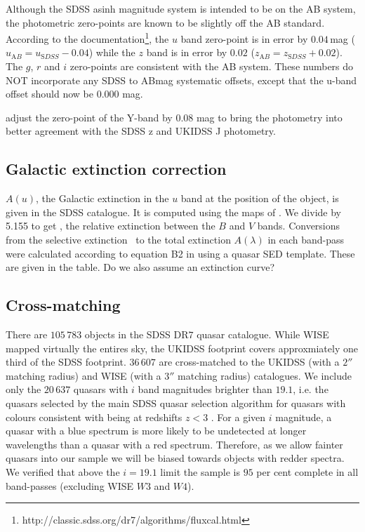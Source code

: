 Although the SDSS asinh magnitude system is intended to be on the AB system, the photometric zero-points are known to be slightly off the AB standard. 
According to the documentation\footnote{http://classic.sdss.org/dr7/algorithms/fluxcal.html}, the $u$ band zero-point is in error by $0.04$\,mag ($u_{\mathrm AB} = u_{\mathrm SDSS} - 0.04$) while the $z$ band is in error by $0.02$ ($z_{\mathrm AB} = z_{\mathrm SDSS} + 0.02$). 
The $g$, $r$ and $i$ zero-points are consistent with the AB system. 
These numbers do NOT incorporate any SDSS to ABmag systematic offsets, except that the u-band offset should now be 0.000 mag.

adjust the zero-point of the Y-band by 0.08 mag to bring the photometry into better agreement with the SDSS z and UKIDSS J photometry.



\subsection{Galactic extinction correction}

$A(u)$, the Galactic extinction in the $u$ band at the position of the object, is given in the SDSS catalogue. 
It is computed using the maps of \citet{schlegel98}. 
We divide by 5.155 to get \ebv, the relative extinction between the $B$ and $V$ bands. 
Conversions from the selective extinction \ebv\, to the total extinction $A(\lambda)$ in each band-pass were calculated according to equation B2 in \citet{schlegel98} using a quasar SED template. 
These are given in the table. 
Do we also assume an extinction curve? 


\subsection{Cross-matching}

There are $105\,783$ objects in the SDSS DR$7$ quasar catalogue. 
While WISE mapped virtually the entires sky, the UKIDSS footprint covers approxmiately one third of the SDSS footprint. 
$36\,607$ are cross-matched to the UKIDSS (with a $2''$ matching radius) and WISE (with a $3$$''$ matching radius) catalogues. 
We include only the $20\,637$ quasars with $i$ band magnitudes brighter than $19.1$, i.e. the quasars selected by the main SDSS quasar selection algorithm for quasars with colours consistent with being at redshifts $z < 3$ \citep{richards02}. 
For a given $i$ magnitude, a quasar with a blue spectrum is more likely to be undetected at longer wavelengths than a quasar with a red spectrum. 
Therefore, as we allow fainter quasars into our sample we will be biased towards objects with redder spectra.
We verified that above the $i=19.1$ limit the sample is $95$ per cent complete in all band-passes (excluding WISE $W3$ and $W4$).

